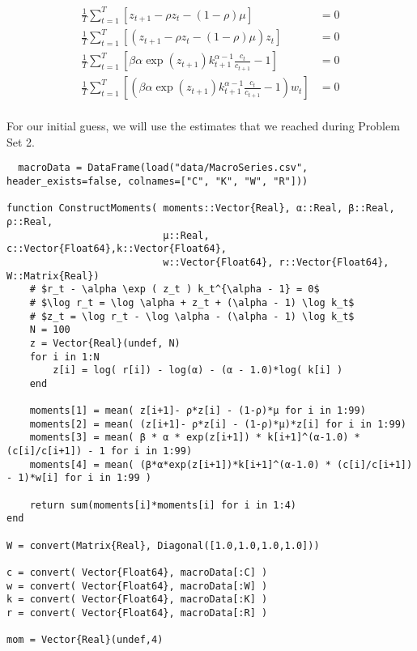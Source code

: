 \documentclass[12pt]{paper}
\newcommand{\brak}[1]{ \left [ #1 \right ] }
\begin{document}
\begin{align*}
  \frac{1}{T} \sum_{t=1}^T \brak{ z_{t+1} - \rho z_t - (1-\rho)\mu} &= 0\\
  \frac{1}{T} \sum_{t=1}^T \brak{ \left( z_{t+1} - \rho z_t - (1-\rho)\mu
  \right)z_t} &= 0\\
  \frac{1}{T} \sum_{t=1}^T \brak{ \beta \alpha \exp(z_{t+1}) k_{t+1}^{\alpha-1}
  \frac{c_t}{c_{t+1}} - 1} &= 0\\
  \frac{1}{T} \sum_{t=1}^T \brak{ \left( \beta \alpha \exp(z_{t+1}) k_{t+1}^{\alpha-1}
  \frac{c_t}{c_{t+1}} - 1 \right) w_t} &= 0\\  
\end{align*}

For our initial guess, we will use the estimates that we reached
during Problem Set 2.

\begin{verbatim}
  macroData = DataFrame(load("data/MacroSeries.csv", header_exists=false, colnames=["C", "K", "W", "R"]))

function ConstructMoments( moments::Vector{Real}, α::Real, β::Real, ρ::Real,
                           μ::Real, c::Vector{Float64},k::Vector{Float64},
                           w::Vector{Float64}, r::Vector{Float64}, W::Matrix{Real})
    # $r_t - \alpha \exp ( z_t ) k_t^{\alpha - 1} = 0$
    # $\log r_t = \log \alpha + z_t + (\alpha - 1) \log k_t$
    # $z_t = \log r_t - \log \alpha - (\alpha - 1) \log k_t$
    N = 100
    z = Vector{Real}(undef, N)
    for i in 1:N
        z[i] = log( r[i]) - log(α) - (α - 1.0)*log( k[i] )
    end

    moments[1] = mean( z[i+1]- ρ*z[i] - (1-ρ)*μ for i in 1:99)
    moments[2] = mean( (z[i+1]- ρ*z[i] - (1-ρ)*μ)*z[i] for i in 1:99)
    moments[3] = mean( β * α * exp(z[i+1]) * k[i+1]^(α-1.0) * (c[i]/c[i+1]) - 1 for i in 1:99)
    moments[4] = mean( (β*α*exp(z[i+1])*k[i+1]^(α-1.0) * (c[i]/c[i+1]) - 1)*w[i] for i in 1:99 )

    return sum(moments[i]*moments[i] for i in 1:4)
end

W = convert(Matrix{Real}, Diagonal([1.0,1.0,1.0,1.0]))

c = convert( Vector{Float64}, macroData[:C] )
w = convert( Vector{Float64}, macroData[:W] )
k = convert( Vector{Float64}, macroData[:K] )
r = convert( Vector{Float64}, macroData[:R] )

mom = Vector{Real}(undef,4)


\end{verbatim}
\end{document}

